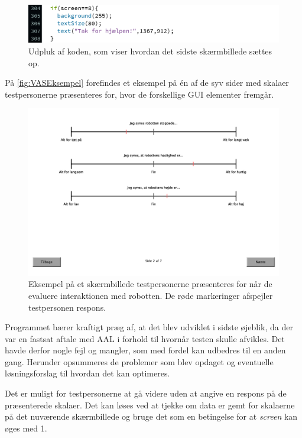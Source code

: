 %
\begin{figure}[H]
\centering
\includegraphics[width =\textwidth]{Figure/VASProgram/Tak} 
\caption{Udpluk af koden, som viser hvordan det sidste skærmbillede sættes op.}
\label{fig:Tak}
\end{figure}
\noindent
%
På \autoref{fig:VASEksempel} forefindes et eksempel på én af de syv sider med skalaer testpersonerne præsenteres for, hvor de forskellige GUI elementer fremgår. 
%
\begin{figure}[H]
\centering
\includegraphics[width =\textwidth]{Figure/VASProgram/VASEksempel} 
\caption{Eksempel på et skærmbillede testpersonerne præsenteres for når de evaluere interaktionen med robotten. De røde markeringer afspejler testpersonen respons.}
\label{fig:VASEksempel}
\end{figure}
\noindent
%
Programmet bærer kraftigt præg af, at det blev udviklet i sidste øjeblik, da der var en fastsat aftale med AAL i forhold til hvornår testen skulle afvikles. Det havde derfor nogle fejl og mangler, som med fordel kan udbedres til en anden gang. Herunder opsummeres de problemer som blev opdaget og eventuelle løsningsforslag til hvordan det kan optimeres. 

Det er muligt for testpersonerne at gå videre uden at angive en respons på de præsenterede skalaer. Det kan løses ved at tjekke om data er gemt for skalaerne på det nuværende skærmbillede og bruge det som en betingelse for at \textit{screen} kan øges med 1.


